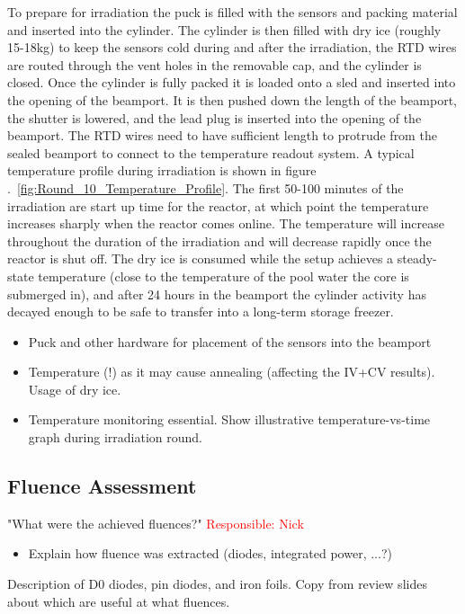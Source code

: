 To prepare for irradiation the puck is filled with the sensors and packing material and inserted into the cylinder. 
The cylinder is then filled with dry ice (roughly 15-18kg) to keep the sensors cold during and after the irradiation, the RTD wires are routed through the vent holes in the removable cap, and the cylinder is closed. 
Once the cylinder is fully packed it is loaded onto a sled and inserted into the opening of the beamport.
It is then pushed down the length of the beamport, the shutter is lowered, and the lead plug is inserted into the opening of the beamport.
The RTD wires need to have sufficient length to protrude from the sealed beamport to connect to the temperature readout system. 
A typical temperature profile during irradiation is shown in figure .~\ref{fig:Round_10_Temperature_Profile}.
The first 50-100 minutes of the irradiation are start up time for the reactor, at which point the temperature increases sharply when the reactor comes online.
The temperature will increase throughout the duration of the irradiation and will decrease rapidly once the reactor is shut off. 
The dry ice is consumed while the setup achieves a steady-state temperature (close to the temperature of the pool water the core is submerged in), and after 24 hours in the beamport the cylinder activity has decayed enough to be safe to transfer into a long-term storage freezer.


\begin{itemize}
  \item Puck and other hardware for placement of the sensors into the beamport
  \item Temperature (!) as it may cause annealing (affecting the IV+CV results). Usage of dry ice.
  \item Temperature monitoring essential. Show illustrative temperature-vs-time graph during irradiation round. 
\end{itemize}

\subsection{Fluence Assessment}
"What were the achieved fluences?" \textcolor{red}{Responsible: Nick}
\label{subsec:fluence_assessment}
\begin{itemize}
  \item Explain how fluence was extracted (diodes, integrated power, ...?)
\end{itemize}

Description of D0 diodes, pin diodes, and iron foils. 
Copy from review slides about which are useful at what fluences. 

